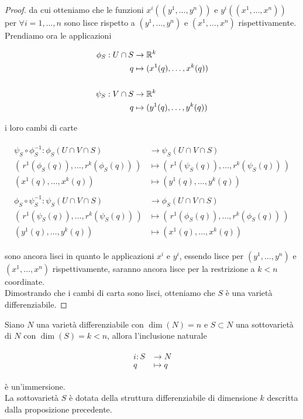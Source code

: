 \begin{proof}
	da cui otteniamo che le funzioni $ x^{i}((y^{1},\dots,y^{n})) $ e $ y^{i}((x^{1},\dots,x^{n})) $ per $ \forall i=1,\dots,n $ sono lisce rispetto a $ (y^{1},\dots,y^{n}) $ e $ (x^{1},\dots,x^{n}) $ rispettivamente.\\
	Prendiamo ora le applicazioni
	
	\begin{align}
		\begin{split}
			\phi_{S} : U \cap S &\to \mathbb{R}^{k}\\
			q &\mapsto (x^{1}(q),\dots,x^{k}(q))\\\\
			\psi_{S} :V \cap S &\to \mathbb{R}^{k}\\
			q &\mapsto (y^{1}(q),\dots,y^{k}(q))
		\end{split}
	\end{align}

	i loro cambi di carte
	
	\begin{align}
		\begin{split}
			\psi_{S} \circ \phi_{S}^{-1} : \phi_{S}(U \cap V \cap S) &\to \psi_{S}(U \cap V \cap S)\\
			(\, r^{1}(\phi_{S}(q)),\dots,r^{k}(\phi_{S}(q)) \,) &\mapsto (\, r^{1}(\psi_{S}(q)),\dots,r^{k}(\psi_{S}(q)) \,)\\
			(x^{1}(q),\dots,x^{k}(q)) &\mapsto (y^{1}(q),\dots,y^{k}(q))\\\\
			\phi_{S} \circ \psi_{S}^{-1} : \psi_{S}(U \cap V \cap S) &\to \phi_{S}(U \cap V \cap S)\\
			(\, r^{1}(\psi_{S}(q)),\dots,r^{k}(\psi_{S}(q)) \,) &\mapsto (\, r^{1}(\phi_{S}(q)),\dots,r^{k}(\phi_{S}(q)) \,)\\
			(y^{1}(q),\dots,y^{k}(q)) &\mapsto (x^{1}(q),\dots,x^{k}(q))
		\end{split}
	\end{align}

	sono ancora lisci in quanto le applicazioni $ x^{i} $ e $ y^{i} $, essendo lisce per $ (y^{1},\dots,y^{n}) $ e $ (x^{1},\dots,x^{n}) $ rispettivamente, saranno ancora lisce per la restrizione a $ k<n $ coordinate.\\
	Dimostrando che i cambi di carta sono lisci, otteniamo che $ S $ è una varietà differenziabile.
\end{proof}

\begin{definition}
	Siano $ N $ una varietà differenziabile con $ \dim(N)=n $ e $ S \subset N $ una sottovarietà di $ N $ con $ \dim(S)=k<n $, allora l'inclusione naturale
	
	\begin{align}
		\begin{split}
			i : S &\to N\\
			q &\mapsto q
		\end{split}
	\end{align}

	è un'immersione.\\
	La sottovarietà $ S $ è dotata della struttura differenziabile di dimensione $ k $ descritta dalla proposizione precedente.
\end{definition}

